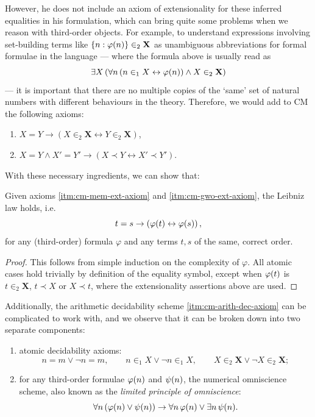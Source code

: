 \documentclass[12pt,openany]{book}
\theoremstyle{plain}
\theoremstyle{definition}
\newcommand\uppar[1]{{\upshape(}#1{\upshape)}}
\newcommand\uplabel[1]{\textup{(#1)}}
\newcommand\opA[1]{\mathop{\forall #1}}
\newcommand\opE[1]{\mathop{\exists #1}}
\newcommand\CM{\mathrm{CM}}
\begin{document}
However, he does not include an axiom of extensionality for these inferred equalities in his formulation, which can bring quite some problems when we reason with third-order objects. For example, to understand expressions involving set-building terms like $\left\{n : \varphi\mleft(n\mright)\right\} \in_2 \mathbf{X}$ as unambiguous abbreviations for formal formulae in the language --- where the formula above is usually read as
\[\opE{X} \left(\opA{n} \left(n \in_1 X \leftrightarrow \varphi\mleft(n\mright)\right) \land X \in_2 \mathbf{X}\right)\]
--- it is important that there are no multiple copies of the `same' set of natural numbers with different behaviours in the theory. Therefore, we would add to $\CM$ the following axioms:
\begin{enumerate}[label=\uplabel{\arabic*},resume=cm-axioms]
  \item \label{itm:cm-mem-ext-axiom} $X = Y \rightarrow \left(X \in_2 \mathbf{X} \leftrightarrow Y \in_2 \mathbf{X}\right)$,
  \item \label{itm:cm-gwo-ext-axiom} $X = Y \land X' = Y' \rightarrow \left(X \prec Y \leftrightarrow X' \prec Y'\right)$.
\end{enumerate}
With these necessary ingredients, we can show that:
\begin{lemma}[$\CM$]
  Given axioms \ref{itm:cm-mem-ext-axiom} and \ref{itm:cm-gwo-ext-axiom}, the Leibniz law holds, i.e.
  \[t = s \rightarrow \left(\varphi\mleft(t\mright) \leftrightarrow \varphi\mleft(s\mright)\right),\]
  for any \uppar{third-order} formula $\varphi$ and any terms $t, s$ of the same, correct order.
\end{lemma}

\begin{proof}
  This follows from simple induction on the complexity of $\varphi$. All atomic cases hold trivially by definition of the equality symbol, except when $\varphi\mleft(t\mright)$ is $t \in_2 \mathbf{X}$, $t \prec X$ or $X \prec t$, where the extensionality assertions above are used.
\end{proof}

Additionally, the arithmetic decidability scheme \ref{itm:cm-arith-dec-axiom} can be complicated to work with, and we observe that it can be broken down into two separate components:
\begin{enumerate}[label=\uplabel{\noexpand\enumdynlabel}]
  \def\enumdynlabel{\cmarithdecaxiomlabel$'$}
  \item \label{itm:cm-atm-dec-axiom} atomic decidability axioms:
        \[n = m \lor \neg n = m, \qquad n \in_1 X \lor \neg n \in_1 X, \qquad X \in_2 \mathbf{X} \lor \neg X \in_2 \mathbf{X};\]
        \def\enumdynlabel{\cmarithdecaxiomlabel$''$}
  \item \label{itm:cm-lpo-axiom} for any third-order formulae $\varphi\mleft(n\mright)$ and $\psi\mleft(n\mright)$, the numerical omniscience scheme, also known as the \emph{limited principle of omniscience}:
        \[\opA{n} \left(\varphi\mleft(n\mright) \lor \psi\mleft(n\mright)\right) \rightarrow \opA{n} \varphi\mleft(n\mright) \lor \opE{n} \psi\mleft(n\mright).\]
\end{enumerate}
\end{document}
